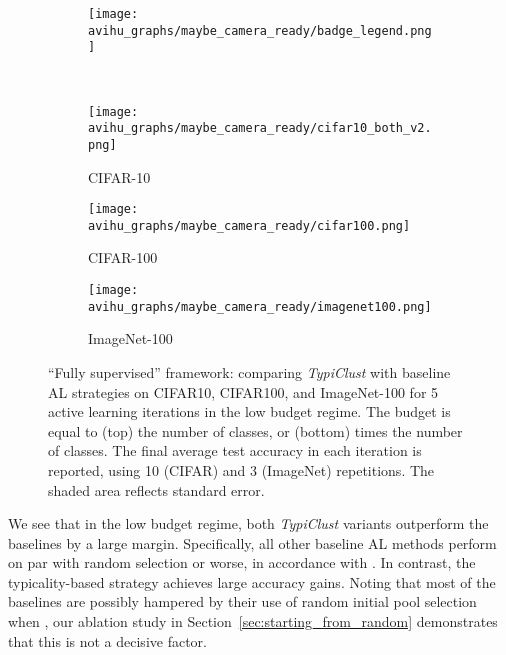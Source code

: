 \documentclass{article}
\begin{document}
\begin{figure}[hbt]
\begin{center}
\vspace{-.05cm}
\begin{subfigure}{.45\textwidth}
  \centering
 \texttt{[image: avihu\_graphs/maybe\_camera\_ready/badge\_legend.png]}
\end{subfigure}
\\
    \begin{subfigure}{.157\textwidth}
      \centering
      \texttt{[image: avihu\_graphs/maybe\_camera\_ready/cifar10\_both\_v2.png]}
\caption{CIFAR-10}
    \label{fig:main_al_graph_cifar10}
    \end{subfigure}
    \begin{subfigure}{.157\textwidth}
      \centering
      \texttt{[image: avihu\_graphs/maybe\_camera\_ready/cifar100.png]}
\caption{CIFAR-100}
    \label{fig:main_al_graph_cifar100}
    \end{subfigure}
    \begin{subfigure}{.157\textwidth}
      \centering
      \texttt{[image: avihu\_graphs/maybe\_camera\_ready/imagenet100.png]}
\caption{ImageNet-100}
    \label{fig:main_al_graph_tinyimagenet}
    \end{subfigure}
\vspace{-0.35cm}
\caption{``Fully supervised'' framework: comparing \emph{TypiClust} with baseline AL strategies on CIFAR10, CIFAR100, and ImageNet-100 for 5 active learning iterations in the low budget regime. The budget  is equal to (top) the number of classes, or (bottom)  times the number of classes. The final average test accuracy in each iteration is reported, using 10 (CIFAR) and 3 (ImageNet) repetitions. The shaded area reflects standard error.}
\label{fig:main_al_graph}
\end{center}
\vspace{-.25cm}
\end{figure}



We see that in the low budget regime, both \emph{TypiClust} variants outperform the baselines by a large margin. Specifically, all other baseline AL methods perform on par with random selection or worse, in accordance with \citet{pourahmadi2021simple}. In contrast, the typicality-based strategy achieves large accuracy gains.
Noting that most of the baselines are possibly hampered by their use of random initial pool selection when , our ablation study in Section~\ref{sec:starting_from_random} demonstrates that this is not a decisive factor.
\end{document}
